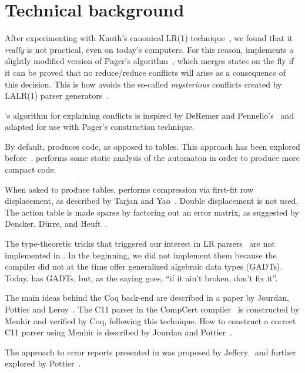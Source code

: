 \documentclass[onecolumn,11pt,nocopyrightspace,preprint]{sigplanconf}
\begin{document}
\section{Technical background}

After experimenting with Knuth's canonical LR(1) technique~\cite{knuth-lr-65},
we found that it \emph{really} is not practical, even on today's computers.
For this reason, \menhir implements a slightly modified version of Pager's
algorithm~\cite{pager-77}, which merges states on the fly if it can be proved
that no reduce/reduce conflicts will arise as a consequence of this decision.
This is how \menhir avoids the so-called \emph{mysterious} conflicts created
by LALR(1) parser generators~\cite[section 5.7]{bison}.

\menhir's algorithm for explaining conflicts is inspired by DeRemer and
Pennello's~\cite{deremer-pennello-82} and adapted for use with Pager's
construction technique.

By default, \menhir produces code, as opposed to tables. This approach has
been explored before~\cite{bhamidipaty-proebsting-98,horspool-faster-90}.
\menhir performs some static analysis of the automaton in order to produce
more compact code.

When asked to produce tables, \menhir performs compression via first-fit
row displacement, as described by Tarjan and Yao~\cite{tarjan-yao-79}.
Double displacement is not used. The action table is made sparse by
factoring out an error matrix, as suggested by Dencker, Dürre, and
Heuft~\cite{dencker-84}.

The type-theoretic tricks that triggered our interest in LR
parsers~\cite{pottier-regis-gianas-typed-lr} are not implemented in \menhir.
In the beginning, we did not implement them because the \ocaml compiler did
not at the time offer generalized algebraic data types (GADTs). Today, \ocaml
has GADTs, but, as the saying goes, ``if it ain't broken, don't fix it''.

The main ideas behind the Coq back-end are described in a paper by Jourdan,
Pottier and Leroy~\cite{jourdan-leroy-pottier-12}. The C11 parser in the
CompCert compiler~\cite{compcert} is constructed by Menhir and verified by
Coq, following this technique. How to construct a correct C11 parser using
Menhir is described by Jourdan and Pottier~\cite{jourdan-pottier-17}.

The approach to error reports presented in  was
proposed by Jeffery~\cite{jeffery-03} and further explored by
Pottier~\cite{pottier-reachability-cc-2016}.
\end{document}
